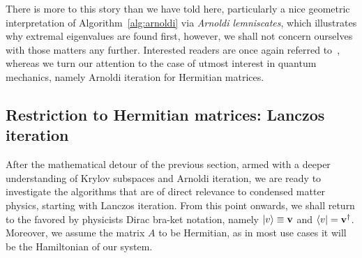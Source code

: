 There is more to this story than we have told here, particularly a nice geometric interpretation
of Algorithm~\ref{alg:arnoldi} via \textit{Arnoldi lemniscates}, which illustrates why extremal eigenvalues
are found first, however, we shall not concern ourselves with those
matters any further. Interested readers are once again referred to~\textcite{Trefethen1997},
whereas we turn our attention to the case of utmost interest in quantum mechanics, namely Arnoldi iteration
for Hermitian matrices.

\subsection{Restriction to Hermitian matrices: Lanczos iteration}

After the mathematical detour of the previous section, armed with a deeper understanding of Krylov subspaces and
Arnoldi iteration, we are ready to investigate the algorithms that are of direct relevance to condensed
matter physics, starting with Lanczos iteration. From this point onwards, we shall return to the favored by physicists
Dirac bra-ket notation, namely \(\ket{v} \equiv \vectorbold{v}\) and \(\bra{v} = \vectorbold{v}^{\dagger}\).
Moreover, we assume the matrix \(A\) to be Hermitian, as in most use cases it will be the Hamiltonian of our system.

